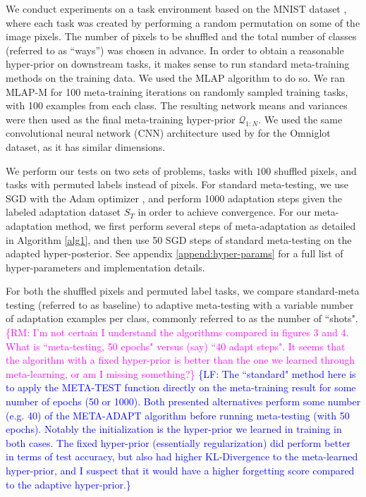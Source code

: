 \documentclass[letterpaper]{article} %
\theoremstyle{definition}
\newcommand{\RM}[1]{\textcolor{magenta}{\{RM: #1\}}}
\newcommand{\LF}[1]{\textcolor{blue}{\{LF: #1\}}}
\begin{document}
We conduct experiments on a task environment based on the MNIST dataset \citep{LeCun1998}, where each task was created by performing a random permutation on some of the image pixels. The number of pixels to be shuffled and the total number of classes (referred to as ``ways'') was chosen in advance. In order to obtain a reasonable hyper-prior on downstream tasks, it makes sense to run standard meta-training methods on the training data.
We used the MLAP \citep{Amit2018}  algorithm to do so. We ran MLAP-M for 100 meta-training iterations on randomly sampled training tasks, with 100 examples from each class. The resulting network means and variances were then used as the final meta-training hyper-prior $\mathcal{Q}_{1:N}$. We used the same convolutional neural network (CNN) architecture used by \citet{Vinyals2016} for the Omniglot dataset, as it has similar dimensions. 

We perform our tests on two sets of problems, tasks with $100$ shuffled pixels, and tasks with permuted labels instead of pixels.
For standard meta-testing, we use SGD with the Adam optimizer \citep{Kingma2015}, and perform 1000 adaptation steps given the labeled adaptation dataset $S_T$ in order to achieve convergence. For our meta-adaptation method, we first perform several steps of meta-adaptation as detailed in Algorithm \ref{alg1}, and then use 50 SGD steps of standard meta-testing on the adapted hyper-posterior. See appendix \ref{append:hyper-params} for a full list of hyper-parameters and implementation details.

For both the shuffled pixels and permuted label tasks, we compare standard-meta testing (referred to as baseline) to adaptive meta-testing with a variable number of adaptation examples per class, commonly referred to as the number of ``shots".
\RM{I'm not certain I understand the algorithms compared in figures 3 and 4. What is ``meta-testing, 50 epochs" versus (say) ``40 adapt steps". It seems that the algorithm with a fixed hyper-prior is better than the one we learned through meta-learning, or am I missing something?}
\LF{The ``standard" method here is to apply the META-TEST function directly on the meta-training result for some number of epochs (50 or 1000). Both presented alternatives perform some number (e.g. 40) of the META-ADAPT algorithm before running meta-testing (with 50 epochs). Notably the initialization is the hyper-prior we learned in training in both cases. The fixed hyper-prior (essentially regularization) did perform better in terms of test accuracy, but also had higher KL-Divergence to the meta-learned hyper-prior, and I suspect that it would have a higher forgetting score compared to the adaptive hyper-prior.}
\end{document}

